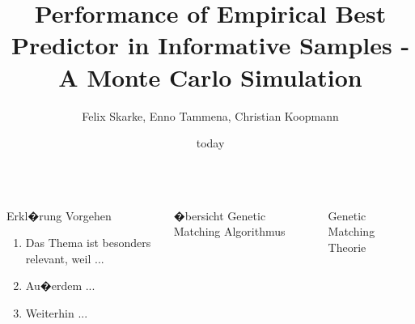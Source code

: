 \documentclass[fleqn,final]{beamer}
\title{\huge Performance of Empirical Best Predictor in Informative Samples - A Monte Carlo Simulation}
\author{\large Felix Skarke, Enno Tammena, Christian Koopmann}
\institute{Freie Universit{\"a}t Berlin, Humboldt Universit{\"a}t zu Berlin}
\date{today}
\newcommand{\Pheight}{\rule[-5mm]{0cm}{1cm}}
\begin{document}
\begin{frame}

%
%
\small
\begin{columns}[t] %

\begin{column}{.3\linewidth} 
\begin{block}{Erkl�rung Vorgehen  \Pheight}
\begin{enumerate} %
\item Das Thema ist besonders relevant, weil ...
\item Au�erdem ...
\item Weiterhin ...

\end{enumerate}

\end{block}
\end{column}

%
%

\begin{column}{.3\linewidth}
\begin{block}{�bersicht Genetic Matching Algorithmus\Pheight}


\end{block}
\end{column}

%
%

\begin{column}{.3\linewidth}
 \begin{block}{Genetic Matching Theorie \Pheight}

\end{block}
\end{column}

%
%

\end{columns}


\begin{columns}[t]


%
%



\end{columns}
\end{frame}
\end{document}
